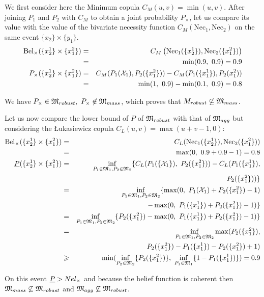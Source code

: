\begin{example}
    
    We first consider here the Minimum copula $C_M(u,v)=\min(u,v)$. After joining $P_1$ and $P_2$ with $C_M$ to obtain a joint probability $P_\times$, let us compare its value with the value of the bivariate necessity function $C_M(\mathrm{Nec}_1, \mathrm{Nec}_2)$ on the same event $\{x_2\}\times\{y_1\}$.
    \begin{eqnarray*}
        \mathrm{Bel}_\times(\{x^1_2\}\times\{x^2_1\}) &=& C_M\left(\mathrm{Nec}_1(\{x^1_2\}), \mathrm{Nec}_2(\{x^2_1\})\right)\\
        &=& \min(0.9,~0.9) = 0.9\\
        P_\times(\{x^1_2\}\times\{x^2_1\}) &=& C_M(P_1({\mathcal{X}}_1), P_2(\{x^2_1\})) - C_M(P_1(\{x^1_1\}),P_2(x^2_1))\\
        &=& \min(1,~0.9) - \min(0.1,~0.9) = 0.8
    \end{eqnarray*}
    
    We have $P_\times\in{\mathfrak{M}}_{robust}, ~P_\times\not\in{\mathfrak{M}}_{mass}$, which proves that ${M}_{robust}\not\subseteq{\mathfrak{M}}_{mass}$.
    
    Let us now compare the lower bound of $\underline{P}$ of ${\mathfrak{M}}_{robust}$ with that of ${\mathfrak{M}}_{agg}$ but considering the \L ukasiewicz copula $C_L(u,v)=\max(u+v-1,0)$:
    \begin{eqnarray*}
        \mathrm{Bel}_\times(\{x^1_2\}\times\{x^2_1\}) &=& C_L(\mathrm{Nec}_1(\{x^1_2\}), \mathrm{Nec}_2(\{x^2_1\}))\\
        &=& \max(0,~0.9 + 0.9 - 1) = 0.8\\
        {\underline{P}}(\{x^1_2\}\times\{x^2_1\}) &=& \inf_{P_1\in{\mathfrak{M}}_1, P_2\in{\mathfrak{M}}_2}\{C_L(P_1(\{{\mathcal{X}}_1\}),~P_2(\{x^2_1\})) - C_L(P_1(\{x^1_1\}),\\
        && P_2(\{x^2_1\}))\}\\
        &=& \inf_{P_1\in{\mathfrak{M}}_1, P_2\in{\mathfrak{M}}_2}\{\max(0,~P_1({\mathcal{X}}_1) + P_2(\{x^2_1\}) - 1)\\
        && - \max(0,~P_1(\{x^1_1\}) + P_2(\{x^2_1\}) -1)\}\\
        &=& \inf_{P_1\in{\mathfrak{M}}_1, P_2\in{\mathfrak{M}}_2}\{P_2(\{x^2_1\}) - \max(0,~P_1(\{x^1_1\}) + P_2(\{x^2_1\}) - 1 )\}\\
        &=& \inf_{P_1\in{\mathfrak{M}}_1, P_2\in{\mathfrak{M}}_2}\max(P_2(\{x^2_1\}),\\
        && P_2(\{x^2_1\})-P_1(\{x^1_1\}) - P_2(\{x^2_1\}) + 1 )\\
        &\geqslant& \min(\inf_{P_2\in{\mathfrak{M}}_2}\{P_2(\{x^2_1\})\},~\inf_{P_1\in{\mathfrak{M}}_1}\{1-P_1(\{x^1_1\})\}) = 0.9
    \end{eqnarray*}
    
    On this event ${\underline{P}}>Nel_\times$ and because the belief function is coherent then ${\mathfrak{M}}_{mass}\not\subseteq{\mathfrak{M}}_{robust}$ and ${\mathfrak{M}}_{agg}\not\subseteq{\mathfrak{M}}_{robust}$.
\end{example}

